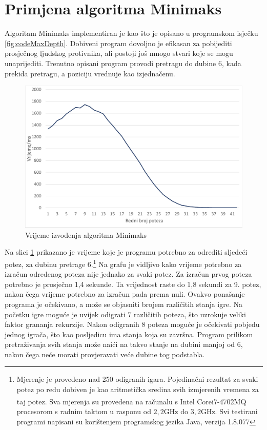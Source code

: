 \documentclass[times, utf8, seminar, numeric, tikz]{fer}
\begin{document}
\section{Primjena algoritma Minimaks}
Algoritam Minimaks implementiran je kao što je opisano u programskom isječku \ref{fig:codeMaxDepth}. Dobiveni program dovoljno je efikasan za pobijediti prosječnog ljudskog protivnika, ali postoji još mnogo stvari koje se mogu unaprijediti. Trenutno opisani program provodi pretragu do dubine 6, kada prekida pretragu, a poziciju vrednuje kao izjednačenu.

\begin{figure}[h]
	\centering
	\includegraphics[width=0.75\linewidth]{Graphs/minimax}
	\caption{Vrijeme izvođenja algoritma Minimaks}
	\label{fig:grafMinimaks}
\end{figure}

Na slici \ref{fig:grafMinimaks} prikazano je vrijeme koje je programu potrebno za odrediti sljedeći potez, za dubinu pretrage 6.\footnote{Mjerenje je provedeno nad 250 odigranih igara. Pojedinačni rezultat za svaki potez po redu dobiven je kao aritmetička sredina svih izmjerenih vremena za taj potez. Sva mjerenja su provedena na računalu s Intel\textsuperscript{\textregistered} Core\texttrademark \space i7-4702MQ procesorom s radnim taktom u rasponu od $2,2$GHz do $3,2$GHz. Svi testirani programi napisani su korištenjem programskog jezika Java, verzija 1.8.077} Na grafu je vidljivo kako vrijeme potrebno za izračun određenog poteza nije jednako za svaki potez. Za izračun prvog poteza potrebno je prosječno 1,4 sekunde. Ta vrijednost raste do 1,8 sekundi za 9. potez, nakon čega vrijeme potrebno za izračun pada prema nuli. Ovakvo ponašanje programa je očekivano, a može se objasniti brojem različitih stanja igre. Na početku igre moguće je uvijek odigrati 7 različitih poteza, što uzrokuje veliki faktor grananja rekurzije. Nakon odigranih 8 poteza moguće je očekivati pobjedu jednog igrača, što kao posljedicu ima stanja koja su završna. Program prilikom pretraživanja svih stanja može naići na takvo stanje na dubini manjoj od 6, nakon čega neće morati provjeravati veće dubine tog podstabla.
\end{document}
